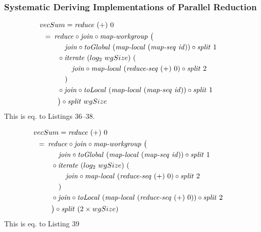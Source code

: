 \subsubsection{Systematic Deriving Implementations of Parallel Reduction}

\begin{align}
  &\hspace{-1.5em}vecSum = \reduce\ (+)\ 0\nonumber\\
  &\hspace{-2em}\quad\begin{aligned}
    &=\hspace{.2em}
      \reduce \circ \join \circ \mapWorkgroup\ \big(\\
      &\qquad\quad \join \circ \toGlobal\ (\mapLocal\ (\mapSeq\ \id)) \circ \splitN\ 1\\
      &\qquad \circ \iterateN\ (log_2\ wgSize)\ (\\
      &\qquad\qquad \join \circ \mapLocal\ (\reduceSeq\ (+)\ 0) \circ \splitN\ 2\\
      &\qquad\quad)\\
      &\qquad \circ \join \circ \toLocal\ (\mapLocal\ (\mapSeq\ \id)) \circ \splitN\ 1\\
      &\qquad\big) \circ \splitN\ wgSize
  \end{aligned}
\end{align}
This is eq. to Listings 36--38.

\begin{align}
  &\hspace{-1.5em}vecSum = \reduce\ (+)\ 0\nonumber\\
  &\hspace{-2em}\quad\begin{aligned}
    &=\hspace{.2em}
      \reduce \circ \join \circ \mapWorkgroup\ \big(\\
      &\qquad\quad \join \circ \toGlobal\ (\mapLocal\ (\mapSeq\ \id)) \circ \splitN\ 1\\
      &\qquad \circ \iterateN\ (log_2\ wgSize)\ (\\
      &\qquad\qquad \join \circ \mapLocal\ (\reduceSeq\ (+)\ 0) \circ \splitN\ 2\\
      &\qquad\quad)\\
      &\qquad \circ \join \circ \toLocal\ (\mapLocal\ (\reduceSeq\ (+)\ 0)) \circ \splitN\ 2\\
      &\qquad\big) \circ \splitN\ (2\times wgSize)
  \end{aligned}
\end{align}
This is eq. to Listing 39

